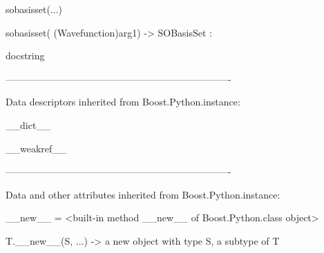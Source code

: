 \documentclass[letterpaper,10pt,english]{sphinxmanual}
\begin{document}
\begin{description}
\begin{description}
\begin{DUlineblock}{0em}
\begin{DUlineblock}{\DUlineblockindent}
\end{DUlineblock}
\item[] sobasisset(...)
\item[]
\begin{DUlineblock}{\DUlineblockindent}
\item[] sobasisset( (Wavefunction)arg1) -\textgreater{} SOBasisSet :
\item[]
\begin{DUlineblock}{\DUlineblockindent}
\item[] docstring
\item[] 
\end{DUlineblock}
\end{DUlineblock}
\item[] ----------------------------------------------------------------------
\item[] Data descriptors inherited from Boost.Python.instance:
\item[] 
\item[] \_\_dict\_\_
\item[] 
\item[] \_\_weakref\_\_
\item[] 
\item[] ----------------------------------------------------------------------
\item[] Data and other attributes inherited from Boost.Python.instance:
\item[] 
\item[] \_\_new\_\_ = \textless{}built-in method \_\_new\_\_ of Boost.Python.class object\textgreater{}
\item[]
\begin{DUlineblock}{\DUlineblockindent}
\item[] T.\_\_new\_\_(S, ...) -\textgreater{} a new object with type S, a subtype of T
\end{DUlineblock}
\end{DUlineblock}


\end{description}
\end{description}
\end{document}
